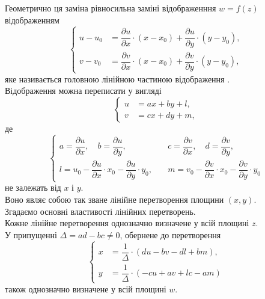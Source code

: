 Геометрично ця заміна рівносильна заміні відображенння $w = f(z)$ відображенням
\begin{equation}
    \label{eq:27.3}
    \left\{
        \begin{aligned}
            u - u_0 &= \dfrac{\partial u}{\partial x} \cdot (x - x_0) + \dfrac{\partial u}{\partial y} \cdot (y - y_0), \\
            v - v_0 &= \dfrac{\partial v}{\partial x} \cdot (x - x_0) + \dfrac{\partial v}{\partial y} \cdot (y - y_0),
        \end{aligned}
    \right.
\end{equation}
яке називається головною лінійною частиною відображення . \\

Відображення  можна переписати у вигляді
\begin{equation}
    \label{eq:27.4}
    \left\{
        \begin{aligned}
            u &= a x + b y + l, \\
            v &= c x + d y + m,
        \end{aligned}
    \right.
\end{equation}
де
\begin{equation}
    \label{eq:27.5}
    \left\{
        \begin{aligned}
            a = \dfrac{\partial u}{\partial x}, \quad b = \dfrac{\partial u}{\partial y}, &\quad c = \dfrac{\partial v}{\partial x}, \quad d = \dfrac{\partial v}{\partial y}, \\
            l = u_0 - \dfrac{\partial u}{\partial x} \cdot x_0 - \dfrac{\partial u}{\partial y} \cdot y_0, &\quad m = v_0 - \dfrac{\partial v}{\partial x} \cdot x_0 - \dfrac{\partial v}{\partial y} \cdot y_0
        \end{aligned}
    \right.
\end{equation}
не залежать від $x$ і $y$. \\

Воно являє собою так зване лінійне перетворення площини $(x, y)$. \\

Згадаємо основні властивості лінійних перетворень. \\

Кожне лінійне перетворення  однозначно визначене у всій площині $z$. \\

У припущенні $\Delta = a d - b c \ne 0$, обернене до  перетворення
\begin{equation}
    \label{eq:27.6}
    \left\{
        \begin{aligned}
            x &= \dfrac 1 \Delta \cdot (d u - b v - d l + b m), \\
            y &= \dfrac 1 \Delta \cdot (- c u + a v + lc - a m)
        \end{aligned}
    \right.
\end{equation}
також однозначно визначене у всій площині $w$. \\

